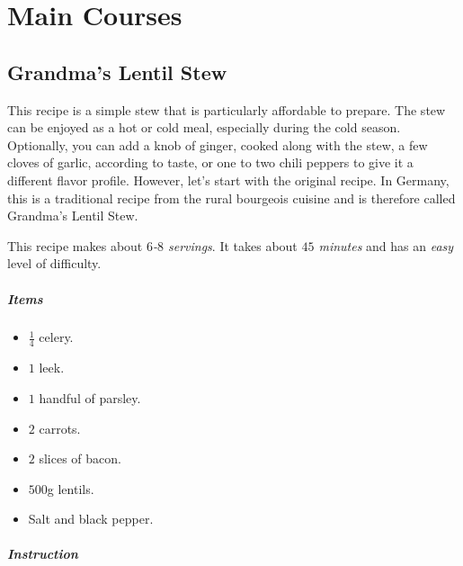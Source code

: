 \chapter{Main Courses}
\section{Grandma's Lentil Stew}
\label{grandmaslentilsstew}

This recipe is a simple stew that is particularly affordable to prepare. The stew can be enjoyed as a hot or cold meal, especially during the cold season. Optionally, you can add a knob of ginger, cooked along with the stew, a few cloves of garlic, according to taste, or one to two chili peppers to give it a different flavor profile. However, let's start with the original recipe. In Germany, this is a traditional recipe from the rural bourgeois cuisine and is therefore called Grandma's Lentil Stew.

This recipe makes about \emph{$6$-$8$ servings}. It takes about \emph{$45$ minutes} and has an \emph{easy} level of difficulty. 

\paragraph{Items}
\begin{itemize}[noitemsep]
	\item[\ding{182}] $\frac{1}{4}$ celery.
	\item[\ding{183}] $1$ leek.
	\item[\ding{184}] $1$ handful of parsley.
	\item[\ding{185}] $2$ carrots.
	\item[\ding{186}] $2$ slices of bacon.
	\item[\ding{187}] $500$g lentils.
	\item[\ding{188}] Salt and black pepper.
\end{itemize}

\paragraph{Instruction} 

